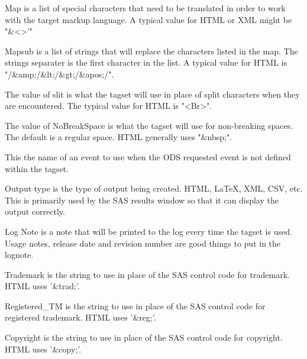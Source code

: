 \begin{description}


Map is a list of special characters that need to be
translated in order to work with the target markup language.
A typical value for HTML or XML might be "\&<>'"

Mapsub is a list of strings that will replace the characters
listed in the map.  The strings separater is the first character
in the list.  A typical value for HTML is "/\&amp;/\&lt;/\&gt;/\&apos;/".


The value of slit is what the tagset will use in place of split characters
when they are encountered.  The typical value for HTML is "<Br>".


The value of NoBreakSpace is what the tagset will use for non-breaking spaces.
The default is a regular space.  HTML generally uses "\&nbsp;".


This the name of an event to use when the ODS requested event is not defined
within the tagset.


Output type is the type of output being created.  HTML, LaTeX, XML, CSV, etc.
This is primarily used by the SAS results window so that it can display the
output correctly.


Log Note is a note that will be printed to the log every time the tagset is used.
Usage notes, release date and revision number are good things to put in the lognote.


Trademark is the string to use in place of the SAS control code for trademark.
HTML uses '\&trad;'.


Registered\_TM is the string to use in place of the SAS control code for registered trademark.
HTML uses '\&reg;'.


Copyright is the string to use in place of the SAS control code for copyright.
HTML uses '\&copy;'.



\end{description}
